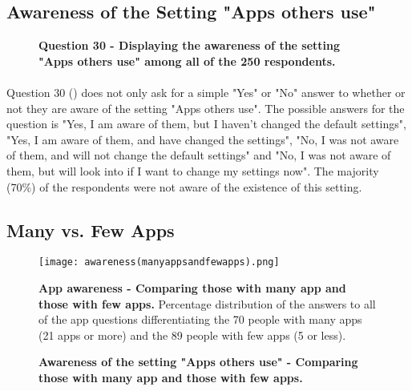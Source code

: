 \subsection{Awareness of the Setting "Apps others use"}

\begin{figure}[t]
\centering
{}
\caption[Question 30 - Displaying the awareness of the setting "Apps others use" among all of the 250 respondents]{\textbf{Question 30 - Displaying the awareness of the setting "Apps others use" among all of the 250 respondents.}} 
\label{fig:appsothersuse}
\end{figure}

\paragraph{}
Question 30 () does not only ask for a simple "Yes" or "No" answer to whether or not they are aware of the setting "Apps others use". The possible answers for the question is "Yes, I am aware of them, but I haven't changed the default settings", "Yes, I am aware of them, and have changed the settings", "No, I was not aware of them, and will not change the default settings" and "No, I was not aware of them, but will look into if I want to change my settings now". The majority (70\%) of the respondents were not aware of the existence of this setting. 


\subsection{Many vs. Few Apps}

\begin{figure}[b]
\centering
\texttt{[image: awareness(manyappsandfewapps).png]}
\caption[App awareness - Comparing those with many app and those with few apps]{\textbf{App awareness - Comparing those with many app and those with few apps.} Percentage distribution of the answers to all of the app questions differentiating the 70 people with many apps (21 apps or more) and the 89 people with few apps (5 or less).} 
\label{fig:manyappsandfewapps}
\end{figure}

\begin{figure}[h!]
\centering
{}
\caption[Awareness of the setting "Apps others use" - Comparing those with many app and those with few apps]{\textbf{Awareness of the setting "Apps others use" - Comparing those with many app and those with few apps.}} 
\label{fig:appsothersusemanyfew}
\end{figure}

